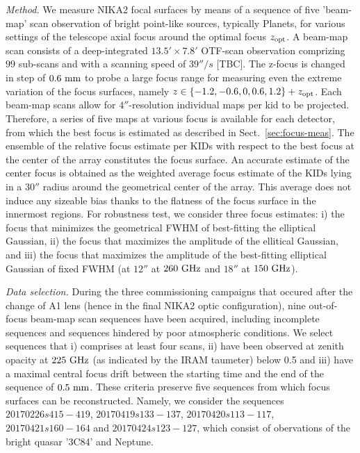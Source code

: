 \emph{Method. } We measure NIKA2 focal surfaces by means of a sequence of five 'beam-map'
scan observation of bright point-like sources, typically Planets,
for various settings of the telescope axial focus around the
optimal focus $z_{\rm{opt}}$. A beam-map scan consists of a deep-integrated
$13.5' \times 7.8'$ OTF-scan observation comprizing $99$ sub-scans and
with a scanning speed of $39''/s$ [TBC]. The z-focus is changed in step of
$0.6~\rm{mm}$ to probe a large focus range for measuring even the
extreme variation of the focus surfaces,
namely $z \in \{-1.2, -0.6, 0, 0.6, 1.2 \} + z_{\rm{opt}}$.
Each beam-map scans allow for $4''$-resolution individual maps per kid to
be projected. Therefore, a series of five maps at various focus is
available for each detector, from which the best focus is estimated as
described in Sect.~\ref{sec:focus-meas}. The ensemble of the relative
focus estimate per KIDs with respect to the best focus at the center
of the array constitutes the focus surface. An accurate estimate of
the center focus is obtained as the
weighted average focus estimate of the KIDs lying in a $30''$ radius
around the geometrical center of the array. This average does not
induce any sizeable bias thanks to the flatness of the focus surface
in the innermost regions. For robustness test, we consider three focus
estimates: i) the focus that minimizes the geometrical FWHM of
best-fitting the elliptical Gaussian, ii) the focus that maximizes the
amplitude of the ellitical Gaussian, and iii) the focus that maximizes
the amplitude of the best-fitting elliptical
Gaussian of fixed FWHM (at $12''$ at $260~\rm{GHz}$ and $18''$ at
$150~\rm{GHz}$). 

\emph{Data selection. }
During the three commissioning campaigns that occured after the change of A1
lens (hence in the final NIKA2 optic configuration), nine out-of-focus
beam-map scan sequences have been acquired, including incomplete
sequences and sequences hindered by poor atmospheric conditions. We
select sequences that i) comprises at least four scans, ii) have been
observed at zenith opacity at $225~\rm{GHz}$ (as indicated by
the IRAM taumeter) below 0.5 and iii) have a maximal central focus
drift between the starting time and the end of the sequence of
$0.5~\rm{mm}$. These criteria preserve five sequences from which focus
surfaces can be reconstructed. Namely, we consider the sequences
$20170226s415-419$, $20170419s133-137$, $20170420s113-117$,
$20170421s160-164$ and $20170424s123-127$, which consist of obervations
of the bright quasar '3C84' and Neptune.

